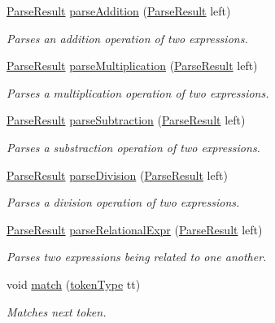 \begin{DoxyCompactItemize}
\hyperlink{classParseResult}{Parse\-Result} \hyperlink{classParser_ae09cb2b5a7f80c6ad4ad9ccf27a746ca}{parse\-Addition} (\hyperlink{classParseResult}{Parse\-Result} left)
\begin{DoxyCompactList}\small\item\em Parses an addition operation of two expressions. \end{DoxyCompactList}\item 
\hyperlink{classParseResult}{Parse\-Result} \hyperlink{classParser_a52e6a57d53fc98e5819cc51b3cbe5bd5}{parse\-Multiplication} (\hyperlink{classParseResult}{Parse\-Result} left)
\begin{DoxyCompactList}\small\item\em Parses a multiplication operation of two expressions. \end{DoxyCompactList}\item 
\hyperlink{classParseResult}{Parse\-Result} \hyperlink{classParser_ac22cf1f77e0ca4c23942d5cbcc47eb37}{parse\-Subtraction} (\hyperlink{classParseResult}{Parse\-Result} left)
\begin{DoxyCompactList}\small\item\em Parses a substraction operation of two expressions. \end{DoxyCompactList}\item 
\hyperlink{classParseResult}{Parse\-Result} \hyperlink{classParser_ad05e6cd1bf83179ecb727b83cbbd0c4e}{parse\-Division} (\hyperlink{classParseResult}{Parse\-Result} left)
\begin{DoxyCompactList}\small\item\em Parses a division operation of two expressions. \end{DoxyCompactList}\item 
\hyperlink{classParseResult}{Parse\-Result} \hyperlink{classParser_ab42ecabc4dbe601d5ed9667351c0c0b8}{parse\-Relational\-Expr} (\hyperlink{classParseResult}{Parse\-Result} left)
\begin{DoxyCompactList}\small\item\em Parses two expressions being related to one another. \end{DoxyCompactList}\item 
void \hyperlink{classParser_a3199aab5275c8b6477245eb866fabf35}{match} (\hyperlink{scanner_8h_ab7f9b765cab7ed98e5a7f05690f6a061}{token\-Type} tt)
\begin{DoxyCompactList}\small\item\em Matches next token. \end{DoxyCompactList}\item 

\end{DoxyCompactItemize}
